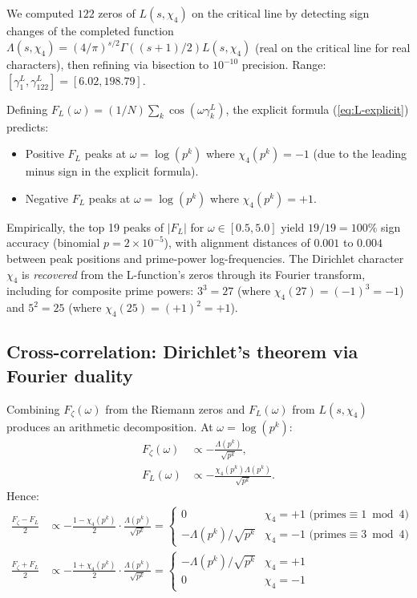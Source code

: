 \documentclass[11pt,a4paper]{article}
\theoremstyle{plain}
\theoremstyle{definition}
\theoremstyle{remark}
\begin{document}
We computed $122$ zeros of $L(s, \chi_4)$ on the critical line by
detecting sign changes of the completed function
$\Lambda(s, \chi_4) = (4/\pi)^{s/2} \Gamma((s+1)/2) L(s, \chi_4)$
(real on the critical line for real characters), then refining via
bisection to $10^{-10}$ precision. Range: $[\gamma_1^L, \gamma_{122}^L]
= [6.02, 198.79]$.

Defining $F_L(\omega) = (1/N) \sum_k \cos(\omega \gamma_k^L)$, the
explicit formula (\ref{eq:L-explicit}) predicts:
\begin{itemize}
\item Positive $F_L$ peaks at $\omega = \log(p^k)$ where $\chi_4(p^k) = -1$
(due to the leading minus sign in the explicit formula).
\item Negative $F_L$ peaks at $\omega = \log(p^k)$ where $\chi_4(p^k) = +1$.
\end{itemize}

Empirically, the top 19 peaks of $|F_L|$ for $\omega \in [0.5, 5.0]$
yield $19/19 = 100\%$ sign accuracy (binomial $p = 2 \times 10^{-5}$),
with alignment distances of $0.001$ to $0.004$ between peak positions
and prime-power log-frequencies. The Dirichlet character $\chi_4$ is
\emph{recovered} from the L-function's zeros through its Fourier transform,
including for composite prime powers: $3^3 = 27$ (where
$\chi_4(27) = (-1)^3 = -1$) and $5^2 = 25$ (where $\chi_4(25) = (+1)^2 = +1$).

\subsection{Cross-correlation: Dirichlet's theorem via Fourier duality}
\label{sec:dirichlet-theorem}

Combining $F_\zeta(\omega)$ from the Riemann zeros and $F_L(\omega)$
from $L(s, \chi_4)$ produces an arithmetic decomposition. At
$\omega = \log(p^k)$:
\begin{align}
  F_\zeta(\omega) &\propto -\frac{\Lambda(p^k)}{\sqrt{p^k}}, \\
  F_L(\omega) &\propto -\frac{\chi_4(p^k)\Lambda(p^k)}{\sqrt{p^k}}.
\end{align}
Hence:
\begin{align}
  \frac{F_\zeta - F_L}{2} &\propto -\frac{1 - \chi_4(p^k)}{2}
  \cdot \frac{\Lambda(p^k)}{\sqrt{p^k}}
  = \begin{cases} 0 & \chi_4 = +1 \text{ (primes} \equiv 1 \bmod 4) \\
  -\Lambda(p^k)/\sqrt{p^k} & \chi_4 = -1 \text{ (primes} \equiv 3 \bmod 4) \end{cases} \\
  \frac{F_\zeta + F_L}{2} &\propto -\frac{1 + \chi_4(p^k)}{2}
  \cdot \frac{\Lambda(p^k)}{\sqrt{p^k}}
  = \begin{cases} -\Lambda(p^k)/\sqrt{p^k} & \chi_4 = +1 \\
  0 & \chi_4 = -1 \end{cases}
\end{align}
\end{document}
